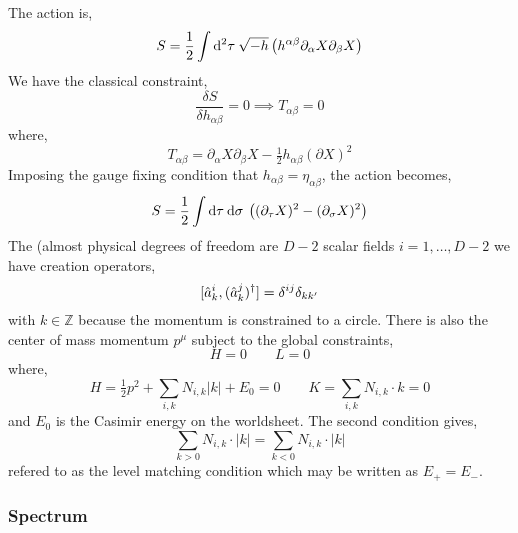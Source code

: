 \documentclass[12pt]{extarticle}
\begin{document}
The action is,
\[ S = \frac{1}{2} \int \mathrm{d}^{2} \tau \: \sqrt{-h} \left( h^{\alpha \beta} \partial_\alpha X \partial_\beta X \right) \]
We have the classical constraint,
\[ \frac{\delta S}{\delta h_{\alpha \beta}} = 0 \implies T_{\alpha \beta} = 0 \]
where,
\[ T_{\alpha \beta} = \partial_\alpha X \partial_\beta X - \tfrac{1}{2} h_{\alpha \beta} (\partial X)^2 \]
Imposing the gauge fixing condition that $h_{\alpha \beta} = \eta_{\alpha \beta}$, the action becomes,
\[ S = \frac{1}{2} \int \mathrm{d}\tau \: \mathrm{d}\sigma \: \left( (\partial_\tau X)^2 - (\partial_\sigma X)^2 \right) \]
The (almost physical degrees of freedom are $D - 2$ scalar fields $i = 1, \dots, D-2$ we have creation operators,
\[ [\hat{a}_k^i, (\hat{a}_k^j)^\dagger] = \delta^{ij} \delta_{k k'}\]
with $k \in \mathbb{Z}$ because the momentum is constrained to a circle. There is also the center of mass momentum $p^\mu$ subject to the global constraints,
\[ H = 0 \quad \quad L = 0 \]
where,
\[ H = \tfrac{1}{2} p^2 + \sum_{i,k} N_{i,k} |k| + E_0  = 0 \quad \quad K = \sum_{i,k} N_{i,k} \cdot k = 0 \] 
and $E_0$ is the Casimir energy on the worldsheet. 
The second condition gives,
\[ \sum_{k > 0} N_{i,k} \cdot |k| = \sum_{k < 0} N_{i,k} \cdot |k| \]
refered to as the level matching condition which may be written as $E_+ = E_-$. 

\subsubsection{Spectrum}
\end{document}
